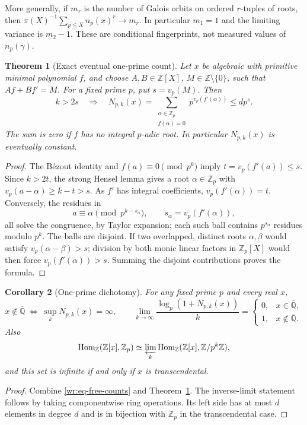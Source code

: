 \documentclass[11pt,a4paper]{article}
\newcommand{\Z}{\mathbb Z}
\newcommand{\Qbar}{\overline{\mathbb Q}}
\newtheorem{theorem}{Theorem}[section]
\newtheorem{corollary}[theorem]{Corollary}
\theoremstyle{definition}
\theoremstyle{remark}
\numberwithin{equation}{section}
\begin{document}
More generally, if \(m_r\) is the number of Galois orbits on ordered
\(r\)-tuples of roots, then
\(\pi(X)^{-1}\sum_{p\le X}n_p(x)^r\to m_r\). In particular \(m_1=1\)
and the limiting variance is \(m_2-1\). These are conditional
fingerprints, not measured values of \(n_p(\gamma)\).

\begin{theorem}[Exact eventual one-prime count]\label{wr:thm-eventual}
Let \(x\) be algebraic with primitive minimal polynomial \(f\), and
choose \(A,B\in\Z[X]\), \(M\in\Z\setminus\{0\}\), such that
\(Af+Bf'=M\). For a fixed prime \(p\), put \(s=v_p(M)\). Then
\begin{equation}\label{wr:eq-eventual}
 k>2s\quad\Longrightarrow\quad
 N_{p,k}(x)=
 \sum_{\substack{\alpha\in\Z_p\\f(\alpha)=0}}
 p^{v_p(f'(\alpha))}\le d p^s.
\end{equation}
The sum is zero if \(f\) has no integral \(p\)-adic root. In particular
\(N_{p,k}(x)\) is eventually constant.
\end{theorem}
\begin{proof}
The B\'ezout identity and \(f(a)\equiv0\pmod{p^k}\) imply
\(t=v_p(f'(a))\le s\). Since \(k>2t\), the strong Hensel lemma
\cite[Theorem~4.1]{wr:hensel} gives a root \(\alpha\in\Z_p\) with
\(v_p(a-\alpha)\ge k-t>s\). As \(f'\) has integral coefficients,
\(v_p(f'(\alpha))=t\). Conversely, the residues in
\[
 a\equiv\alpha\pmod{p^{k-s_\alpha}},\qquad
 s_\alpha=v_p(f'(\alpha)),
\]
all solve the congruence, by Taylor expansion; each such ball contains
\(p^{s_\alpha}\) residues modulo \(p^k\). The balls are disjoint. If
two overlapped, distinct roots \(\alpha,\beta\) would satisfy
\(v_p(\alpha-\beta)>s\); division by both monic linear factors in
\(\Z_p[X]\) would then force \(v_p(f'(\alpha))>s\). Summing the
disjoint contributions proves the formula.
\end{proof}

\begin{corollary}[One-prime dichotomy]\label{wr:cor-one-prime}
For any fixed prime \(p\) and every real \(x\),
\[
 x\notin\Qbar\ \Longleftrightarrow\ \sup_kN_{p,k}(x)=\infty,
 \qquad
 \lim_{k\to\infty}\frac{\log_p(1+N_{p,k}(x))}{k}
 =\begin{cases}0,&x\in\Qbar,\\1,&x\notin\Qbar.\end{cases}
\]
Also
\[
 \operatorname{Hom}_\Z(\Z[x],\Z_p)
 \simeq\varprojlim_k\operatorname{Hom}_\Z(\Z[x],\Z/p^k\Z),
\]
and this set is infinite if and only if \(x\) is transcendental.
\end{corollary}
\begin{proof}
Combine \eqref{wr:eq-free-counts} and Theorem~\ref{wr:thm-eventual}.
The inverse-limit statement follows by taking componentwise ring
operations. Its left side has at most \(d\) elements in degree \(d\)
and is in bijection with \(\Z_p\) in the transcendental case.
\end{proof}
\end{document}
